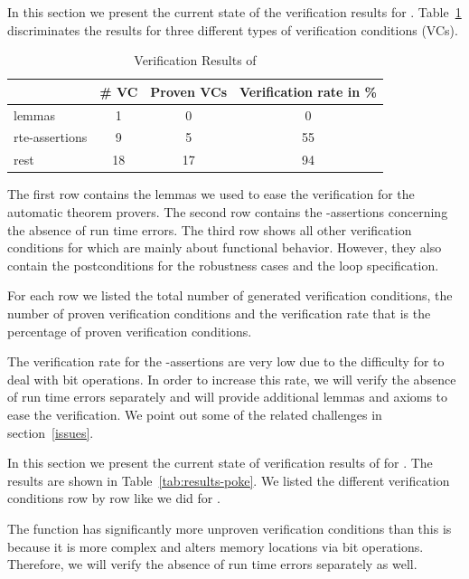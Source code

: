 In this section we present the current state of the verification results 
for \peek.
Table~\ref{tab:results-peek} discriminates the results for
three different types of verification conditions (VCs).

\begin{table}[hbt]
  \centering
  \begin{tabular}[htb]{lccc}
    \toprule
     & \# VC & Proven VCs & Verification rate in \%\\
    \midrule
    lemmas & 1 &0 & 0 \\
    rte-assertions&9&5&55\\
    rest &18 &17&94\\
    \bottomrule
  \end{tabular}
  \caption{Verification Results of \peek}
  \label{tab:results-peek}
\end{table}


The first row contains the lemmas we used to ease the verification for the automatic theorem provers.
The second row contains the -assertions 
concerning the absence of run time errors.
The third row shows all other verification conditions for \peek
which are mainly about functional behavior.
However, they also contain the postconditions for the robustness cases
and the loop specification.

For each row we listed the total number of generated verification conditions,
the number of proven verification conditions and the verification rate
that is the percentage of proven verification conditions. 

The verification rate for the -assertions are very low 
due to the difficulty for \framac to deal with bit operations.
In order to increase this rate, we will verify the absence
of run time errors separately and will provide additional lemmas and axioms
to ease the verification.
We point out some of the related challenges in section~\ref{issues}.



In this section we present the current state of verification results of 
for \poke.
The results are shown in Table~\ref{tab:results-poke}.
 We listed the different verification conditions 
 row by row like we did for \peek.

The function \poke has significantly more unproven verification conditions than \peek
this is because it is more complex and alters memory locations via bit operations.
Therefore, we will verify the absence of run time errors separately as well.

